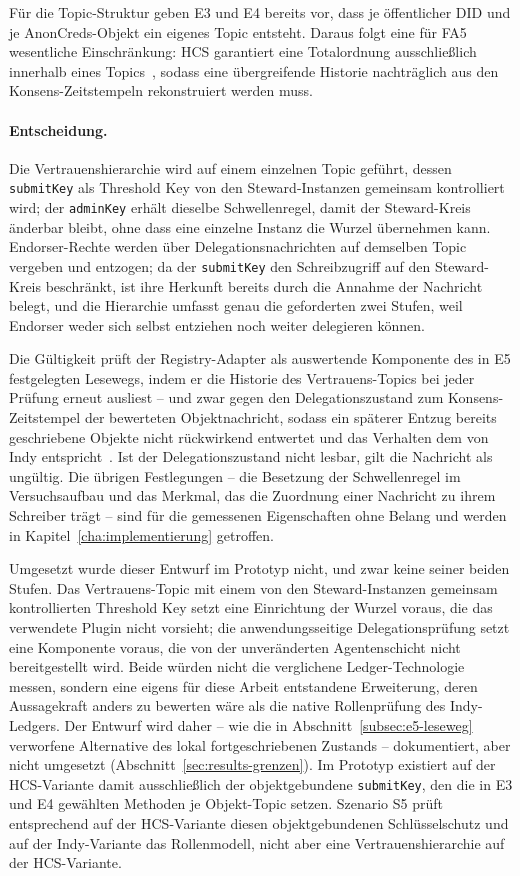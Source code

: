 Für die Topic-Struktur geben E3 und E4 bereits vor, dass je öffentlicher DID und je AnonCreds-Objekt ein eigenes Topic entsteht. Daraus folgt eine für FA5 wesentliche Einschränkung: HCS garantiert eine Totalordnung ausschließlich innerhalb eines Topics~\cite{bairdgross2019}, sodass eine übergreifende Historie nachträglich aus den Konsens-Zeitstempeln rekonstruiert werden muss.

\paragraph{Entscheidung.}
Die Vertrauenshierarchie wird auf einem einzelnen Topic geführt, dessen \texttt{submitKey} als Threshold Key von den Steward-Instanzen gemeinsam kontrolliert wird; der \texttt{adminKey} erhält dieselbe Schwellenregel, damit der Steward-Kreis änderbar bleibt, ohne dass eine einzelne Instanz die Wurzel übernehmen kann. Endorser-Rechte werden über Delegationsnachrichten auf demselben Topic vergeben und entzogen; da der \texttt{submitKey} den Schreibzugriff auf den Steward-Kreis beschränkt, ist ihre Herkunft bereits durch die Annahme der Nachricht belegt, und die Hierarchie umfasst genau die geforderten zwei Stufen, weil Endorser weder sich selbst entziehen noch weiter delegieren können.

Die Gültigkeit prüft der Registry-Adapter als auswertende Komponente des in E5 festgelegten Lesewegs, indem er die Historie des Vertrauens-Topics bei jeder Prüfung erneut ausliest -- und zwar gegen den Delegationszustand zum Konsens-Zeitstempel der bewerteten Objektnachricht, sodass ein späterer Entzug bereits geschriebene Objekte nicht rückwirkend entwertet und das Verhalten dem von Indy entspricht~\cite{torongo2023}. Ist der Delegationszustand nicht lesbar, gilt die Nachricht als ungültig. Die übrigen Festlegungen -- die Besetzung der Schwellenregel im Versuchsaufbau und das Merkmal, das die Zuordnung einer Nachricht zu ihrem Schreiber trägt -- sind für die gemessenen Eigenschaften ohne Belang und werden in Kapitel~\ref{cha:implementierung} getroffen.

Umgesetzt wurde dieser Entwurf im Prototyp nicht, und zwar keine seiner beiden Stufen. Das Vertrauens-Topic mit einem von den Steward-Instanzen gemeinsam kontrollierten Threshold Key setzt eine Einrichtung der Wurzel voraus, die das verwendete Plugin nicht vorsieht; die anwendungsseitige Delegationsprüfung setzt eine Komponente voraus, die von der unveränderten Agentenschicht nicht bereitgestellt wird. Beide würden nicht die verglichene Ledger-Technologie messen, sondern eine eigens für diese Arbeit entstandene Erweiterung, deren Aussagekraft anders zu bewerten wäre als die native Rollenprüfung des Indy-Ledgers. Der Entwurf wird daher -- wie die in Abschnitt~\ref{subsec:e5-leseweg} verworfene Alternative des lokal fortgeschriebenen Zustands -- dokumentiert, aber nicht umgesetzt (Abschnitt~\ref{sec:results-grenzen}). Im Prototyp existiert auf der HCS-Variante damit ausschließlich der objektgebundene \texttt{submitKey}, den die in E3 und E4 gewählten Methoden je Objekt-Topic setzen. Szenario S5 prüft entsprechend auf der HCS-Variante diesen objektgebundenen Schlüsselschutz und auf der Indy-Variante das Rollenmodell, nicht aber eine Vertrauenshierarchie auf der HCS-Variante.

